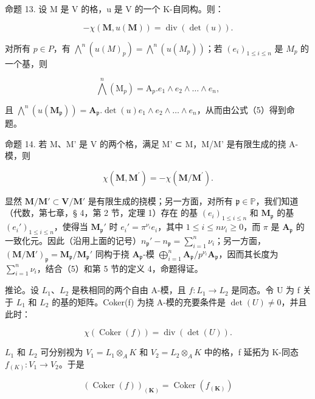 命题 13. 设 M 是 V 的格，u 是 V 的一个 K-自同构。则：

\[
- \chi (\mathbf {M}, u (\mathbf {M})) = \operatorname{div} (\det (u)).\tag{6}
\]

对所有 \(p \in P\)，有 \(\bigwedge^{n} (u(M)_{p}) = \bigwedge^{n} (u(M_{p}))\)；若 \((e_{i})_{1 \leqslant i \leqslant n}\) 是 \(M_{p}\) 的一个基，则

\[
\bigwedge^ {n} \left(\mathrm{M} _ {p}\right) = \mathrm{A} _ {p}. e _ {1} \wedge e _ {2} \wedge \dots \wedge e _ {n},
\]

且 \(\bigwedge^{n}(u(\mathbf{M}_{\mathfrak{p}})) = \mathbf{A}_{\mathfrak{p}}.\det (u)e_{1}\wedge e_{2}\wedge \dots \wedge e_{n}\)，从而由公式（5）得到命题。

命题 14. 若 M、M' 是 V 的两个格，满足 M' ⊂ M，M/M' 是有限生成的挠 A-模，则

\[
\chi (\mathbf {M}, \mathbf {M} ^ {\prime}) = - \chi (\mathbf {M} / \mathbf {M} ^ {\prime}).\tag{7}
\]

显然 \(\mathbf{M} / \mathbf{M}' \subset \mathbf{V} / \mathbf{M}'\) 是有限生成的挠模；另一方面，对所有 \(\mathfrak{p} \in \mathbb{P}\)，我们知道（代数，第七章，§ 4，第 2 节，定理 1）存在  的基 \((e_i)_{1 \leqslant i \leqslant n}\) 和 \(\mathbf{M}_{\mathfrak{p}}\) 的基 \((e_i')_{1 \leqslant i \leqslant n}\)，使得当 \(\mathbf{M}_{\mathfrak{p}}'\) 时 \(e_i' = \pi^{\nu_i} e_i\)，其中 \(1 \leqslant i \leqslant n\)\(\nu_i \geqslant 0\)，而 \(\pi\) 是 \(\mathbf{A}_{\mathfrak{p}}\) 的一致化元。因此（沿用上面的记号）\(n_{\mathfrak{p}}' - n_{\mathfrak{p}} = \sum_{i=1}^{n} \nu_i\)；另一方面，\((\mathbf{M} / \mathbf{M}')_{\mathfrak{p}} = \mathbf{M}_{\mathfrak{p}} / \mathbf{M}_{\mathfrak{p}}'\) 同构于挠 \(\mathbf{A}_{\mathfrak{p}}\)-模 \(\bigoplus_{i=1}^{n} \mathbf{A}_{\mathfrak{p}} / p^{\nu_i} \mathbf{A}_{\mathfrak{p}}\)，因而其长度为 \(\sum_{i=1}^{n} \nu_i\)，结合（5）和第 5 节的定义 4，命题得证。

推论。设 \(L_{1}\)、\(L_{2}\) 是秩相同的两个自由 A-模，且 \(f: L_{1} \to L_{2}\) 是同态。令 U 为 f 关于 \(L_{1}\) 和 \(L_{2}\) 的基的矩阵。Coker(f) 为挠 A-模的充要条件是 \(\det(U) \neq 0\)，并且此时：

\[
\chi (\operatorname{Coker} (f)) = \operatorname{div} (\det (U)).\tag{8}
\]

\(L_{1}\) 和 \(L_{2}\) 可分别视为 \(V_{1} = L_{1} \otimes_{A} K\) 和 \(V_{2} = L_{2} \otimes_{A} K\) 中的格，f 延拓为 K-同态 \(f_{(K)}: V_{1} \to V_{2}\)。于是

\[
\left(\operatorname{Coker} (f)\right) _ {(\mathbf {K})} = \operatorname{Coker} \left(f _ {(\mathbf {K})}\right)
\]

